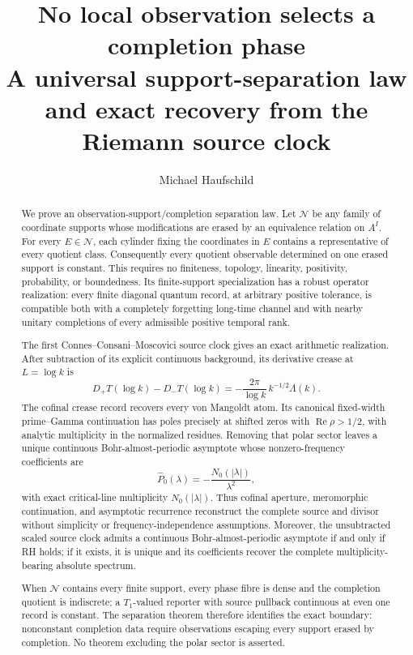 \documentclass[11pt]{article}
\title{\textbf{No local observation selects a completion phase}\\
\large A universal support-separation law and exact recovery from the Riemann source clock}
\author{Michael Haufschild}
\date{}
\theoremstyle{definition}
\theoremstyle{remark}
\newcommand{\Rea}{\operatorname{Re}}
\begin{document}
\maketitle

\begin{abstract}
We prove an observation-support/completion separation law.  Let $\mathcal N$ be any family of
coordinate supports whose modifications are erased by an equivalence relation on $A^I$.  For
every $E\in\mathcal N$, each cylinder fixing the coordinates in $E$ contains a representative of
every quotient class.  Consequently every quotient observable determined on one erased support
is constant.  This requires no finiteness, topology, linearity, positivity, probability, or
boundedness.  Its finite-support specialization has a robust operator realization: every finite
diagonal quantum record, at arbitrary positive tolerance, is compatible
both with a completely forgetting long-time channel and with nearby unitary completions of every
admissible positive temporal rank.

The first Connes--Consani--Moscovici source clock gives an exact arithmetic realization.  After
subtraction of its explicit continuous background, its derivative crease at $L=\log k$ is
\[
 D_+T(\log k)-D_-T(\log k)
   =-\frac{2\pi}{\log k}\,k^{-1/2}\Lambda(k).
\]
The cofinal crease record recovers every von Mangoldt atom.  Its canonical fixed-width
prime--Gamma continuation has poles precisely at shifted zeros with $\Rea\rho>1/2$, with analytic
multiplicity in the normalized residues.  Removing that polar sector leaves a unique continuous
Bohr-almost-periodic asymptote whose nonzero-frequency coefficients are
\[
 \widehat P_0(\lambda)=-\frac{N_0(|\lambda|)}{\lambda^2},
\]
with exact critical-line multiplicity $N_0(|\lambda|)$.  Thus cofinal aperture, meromorphic
continuation, and asymptotic recurrence reconstruct the complete source and divisor without
simplicity or frequency-independence assumptions.  Moreover, the unsubtracted scaled source
clock admits a continuous Bohr-almost-periodic asymptote if and only if RH holds; if it exists,
it is unique and its coefficients recover the complete multiplicity-bearing absolute spectrum.

When $\mathcal N$ contains every finite support, every phase fibre is dense and the completion
quotient is indiscrete; a $T_1$-valued reporter with source pullback continuous at even one record
is constant.  The separation theorem therefore identifies the exact boundary: nonconstant
completion data require observations escaping every support erased by completion.  No theorem
excluding the polar sector
is asserted.
\end{abstract}
\end{document}
